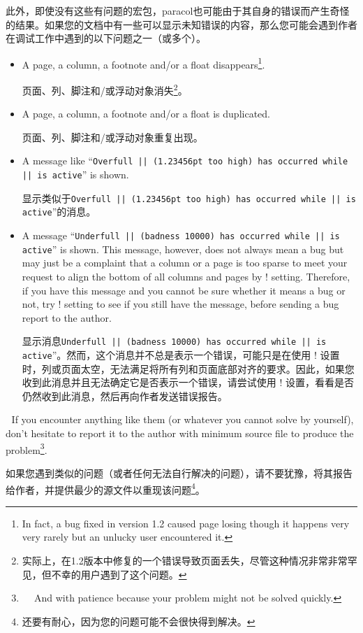 此外，即使没有这些有问题的宏包，\textsf{paracol}也可能由于其自身的错误而产生奇怪的结果。如果您的文档中有一些可以显示未知错误的内容，那么您可能会遇到作者在调试工作中遇到的以下问题之一（或多个）。
 \begin{itemize}
 \item
 A page, a column, a footnote and/or a float disappears\footnote{%
 In fact, a bug fixed in version 1.2 caused page losing though it happens
 very very rarely but an unlucky user encountered it.}.
 
页面、列、脚注和/或浮动对象消失\footnote{实际上，在1.2版本中修复的一个错误导致页面丢失，尽管这种情况非常非常罕见，但不幸的用户遇到了这个问题。}。
 \item
 A page, a column, a footnote and/or a float is duplicated.

页面、列、脚注和/或浮动对象重复出现。
 \item
 A message like ``{\tt Overfull |\vbox| (1.23456pt too high) has occurred
 while |\ouptut| is active}'' is shown.

显示类似于{\tt Overfull |\vbox| (1.23456pt too high) has occurred while |\ouptut| is active}''的消息。 
 \item
 A message ``{\tt Underfull |\vbox| (badness 10000) has occurred while
 |\ouptut| is active}'' is shown.  This message, however, does not always
 mean a bug but may just be a complaint that a column or a page is too
 sparse to meet your request to align the bottom of all columns and pages
 by \!\flushbottom! setting.  Therefore, if you have this message and you
 cannot be sure whether it means a bug or not, try \!\raggedbottom! setting
 to see if you still have the message, before sending a bug report to the
 author.

显示消息{\tt Underfull |\vbox| (badness 10000) has occurred while |\ouptut| is active}''。然而，这个消息并不总是表示一个错误，可能只是在使用 \!\flushbottom! 设置时，列或页面太空，无法满足将所有列和页面底部对齐的要求。因此，如果您收到此消息并且无法确定它是否表示一个错误，请尝试使用 \!\raggedbottom! 设置，看看是否仍然收到此消息，然后再向作者发送错误报告。
 \end{itemize}
 
 If you encounter anything like them (or whatever you cannot solve by
 yourself), don't hesitate to report it to the author with minimum source
 file to produce the problem\footnote{
 
 And with patience because your problem might not be solved quickly.}.

如果您遇到类似的问题（或者任何无法自行解决的问题），请不要犹豫，将其报告给作者，并提供最少的源文件以重现该问题\footnote{还要有耐心，因为您的问题可能不会很快得到解决。}。 

